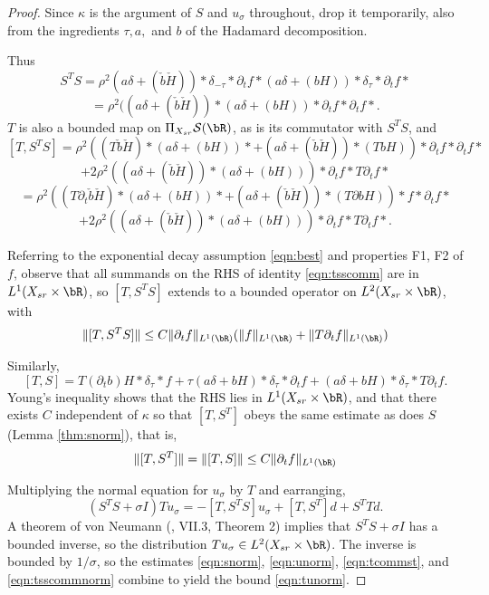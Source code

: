 \begin{proof}
  Since $\kappa$ is the argument of $S$ and $u_{\sigma}$ throughout, drop it
  temporarily, also from the ingredients $\tau, a, $ and $b$ of the
  Hadamard decomposition.
  
  Thus
  \[
    S^TS =
    \rho^2(a\delta  +  (\check{b}\check{H})) *\delta_{-\tau}*\partial_t
    f * (a\delta  +  (bH)) *\delta_{\tau}*\partial_t f*
  \]
  \[
    = \rho^2((a\delta  +  (\check{b}\check{H}))*(a\delta  +
    (bH))*\partial_t f *\partial_t f*.
  \]
  $T$ is also a bounded map on $\Pi_{X_{sr}} {\cal S}(\bR)$, as is
  its commutator with $S^TS$, and 
  \[
    [T,S^TS] = \rho^2((T\check{b}\check{H}) *(a\delta  +
    (bH))*+ (a\delta  +  (\check{b}\check{H}))*(TbH))*\partial_t f
    *\partial_t f*
  \]
  \[
    +2\rho^2((a\delta  +  (\check{b}\check{H}))*(a\delta  +
    (bH)))* \partial_t f  *T\partial_t f*
  \]
  \[
    =\rho^2((T\partial_t\check{b}\check{H}) *(a\delta  +
    (bH))*+ (a\delta  +  (\check{b}\check{H}))*(T\partial bH))* f
    *\partial_t f*
   \]
  \begin{equation}
    \label{eqn:tsscomm}
     +2\rho^2((a\delta  +  (\check{b}\check{H}))*(a\delta  +
    (bH)))* \partial_t f  *T\partial_t f*.
  \end{equation}
  
  Referring to the exponential decay assumption \ref{eqn:best}
  and properties F1, F2 of $f$, 
  observe that all summands on the RHS of identity \ref{eqn:tsscomm} are in
  $L^1(X_{sr} \times \bR)$, so $[T,S^TS]$ extends to a bounded
  operator on $L^2(X_{sr}\times \bR)$, with
  \begin{equation}
    \label{eqn:tsscommnorm}
    \|[T,S^TS]\| \le C\|\partial_t f\|_{L^1(\bR)}(\|f\|_{L^1(\bR)}+\|T\partial_tf\|_{L^1(\bR)})
  \end{equation}
  
  Similarly,
  \[
    [T,S]=T(\partial_t b)H*\delta_{\tau}*f + \tau(a\delta +
    bH)*\delta_{\tau}*\partial_t f + (a\delta +
    bH)*\delta_{\tau}*T\partial_t f.
  \]
  Young's inequality shows that the RHS lies in $L^1(X_{sr}\times
  \bR)$, and that there exists $C$ independent of $\kappa$ so that
  $[T,S^T]$ obeys the same estimate as does $S$ (Lemma
  \ref{thm:snorm}), that is,
  \begin{equation}
    \label{eqn:tcommst}  
    \|[T,S^T]\| = \|[T,S]\| \le C\|\partial_t f\|_{L^1(\bR)}
  \end{equation}
  
  Multiplying the normal equation for $u_{\sigma}$ by $T$ and earranging,
  \[
    (S^TS+\sigma I)Tu_{\sigma} = -[T,S^TS]u_{\sigma} + [T,S^T]d + S^TTd.
  \]
  A theorem of von Neumann (\cite{Yosida}, VII.3, Theorem 2) implies
  that $S^TS+\sigma I$ has a bounded inverse, so the distribution
  $Tu_{\sigma} \in L^2(X_{sr} \times \bR)$. The inverse is bounded by
  $1/\sigma$, so the estimates \ref{eqn:snorm}, \ref{eqn:unorm},
  \ref{eqn:tcommst}, and \ref{eqn:tsscommnorm} combine to yield the
  bound \ref{eqn:tunorm}.
  
\end{proof}

